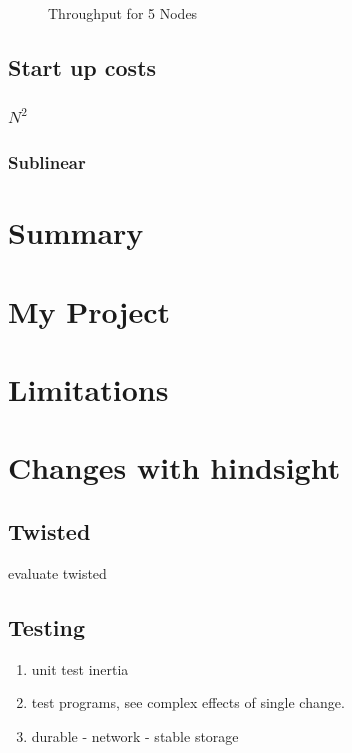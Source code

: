 \documentclass[12pt,twoside,notitlepage]{report}
\newcommand{\lwincludegraphics}[2][]{%
  \sbox{0}{\texttt{[image: \#2]}}%
  \ifdim\wd0>\linewidth
    \resizebox{\linewidth}{!}{\box0 }%
  \else
    \leavevmode\box0
  \fi}
\begin{document}
\begin{figure}[phtb]
\centering
\lwincludegraphics[scale=2]{figs/thru-5.eps}
\caption{\label{fig:thruput-5}Throughput for 5 Nodes}
\end{figure}

\subsection{Start up costs}

\subsubsection{$N^2$}

\subsubsection{Sublinear}

\section{Summary}
\section{My Project}
\section{Limitations}

\section{Changes with hindsight}

\subsection{Twisted}

evaluate twisted


\subsection{Testing}

\begin{enumerate}
	\item unit test inertia
	\item test programs, see complex effects of single change.
	\item durable - network - stable storage
\end{enumerate}
\end{document}
